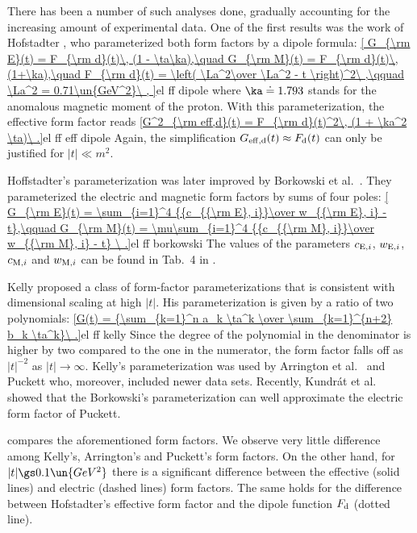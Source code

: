There has been a number of such analyses done, gradually accounting for the increasing amount of experimental data. One of the first results was the work of Hofstadter , who parameterized both form factors by a dipole formula:
\eqref{
	G_{\rm E}(t) = F_{\rm d}(t)\, (1 - \ta\ka),\quad
	G_{\rm M}(t) = F_{\rm d}(t)\, (1+\ka),\quad
	F_{\rm d}(t) = \left( \La^2\over \La^2 - t \right)^2\ ,\qquad
	\La^2 = 0.71\un{GeV^2}\ ,
}{el ff dipole}
where $\ka\doteq 1.793$ stands for the anomalous magnetic moment of the proton. With this parameterization, the effective form factor reads
\eqref{G^2_{\rm eff,d}(t) = F_{\rm d}(t)^2\, (1 + \ka^2 \ta)\ .}{el ff eff dipole}
Again, the simplification $G_{\rm eff,d}(t)\approx F_{\rm d}(t)$ can only be justified for $|t| \ll m^2$.

Hoffstadter's parameterization was later improved by Borkowski et al.~. They parameterized the electric and magnetic form factors by sums of four poles:
\eqref{
G_{\rm E}(t) = \sum_{i=1}^4 {{c_{{\rm E}, i}}\over w_{{\rm E}, i} - t},\qquad
G_{\rm M}(t) = \mu\sum_{i=1}^4 {{c_{{\rm M}, i}}\over w_{{\rm M}, i} - t}
\ .}{el ff borkowski}
The values of the parameters $c_{{\rm E}, i}$, $w_{{\rm E}, i}$, $c_{{\rm M}, i}$ and $w_{{\rm M}, i}$ can be found in Tab.~4 in .

Kelly  proposed a class of form-factor parameterizations that is consistent with dimensional scaling at high $|t|$. His parameterization is given by a ratio of two polynomials:
\eqref{G(t) = {\sum_{k=1}^n a_k \ta^k \over \sum_{k=1}^{n+2} b_k \ta^k}\ .}{el ff kelly}
Since the degree of the polynomial in the denominator is higher by two compared to the one in the numerator, the form factor falls off as $|t|^{-2}$ as $|t|\to\infty$. Kelly's parameterization was used by Arrington et al.\  and Puckett  who, moreover, included newer data sets. Recently, Kundr\' at et al.~ showed that the Borkowski's parameterization can well approximate the electric form factor of Puckett.

 compares the aforementioned form factors. We observe very little difference among Kelly's, Arrington's and Puckett's form factors. On the other hand, for $|t| \gs 0.1\un{GeV^2}$ there is a significant difference between the effective (solid lines) and electric (dashed lines) form factors. The same holds for the difference between Hofstadter's effective form factor and the dipole function $F_{\rm d}$ (dotted line).

